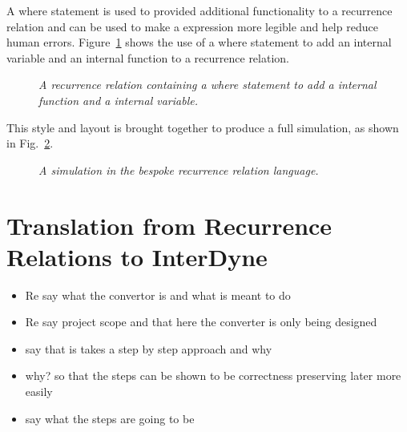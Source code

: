 \documentclass{article}
\begin{document}
A where statement is used to provided additional functionality to a recurrence relation and can be used to make a expression more legible and help reduce human errors. Figure~\ref{fig:7exofla} shows the use of a where statement to add an internal variable and an internal function to a recurrence relation. 
\begin{figure}[H]
	\centering
	
	\caption{\it A recurrence relation containing a where statement to add a internal function and a internal variable.}
	\label{fig:7exofla}
\end{figure} 

This style and layout is brought together to produce a full simulation, as shown in Fig.~\ref{fig:8exofla}.
\begin{figure}[H]
	\centering
	
	\caption{\it A simulation in the bespoke recurrence relation language.}
	\label{fig:8exofla}
\end{figure} 







\section{Translation from Recurrence Relations to InterDyne} 


\begin{itemize}
  \item Re say what the convertor is and what is meant to do
  \item Re say project scope and that here the converter is only being designed 
  \item say that is takes a step by step approach and why 
  \item why? so that the steps can be shown to be correctness preserving later more easily 
  \item say what the steps are going to be 
\end{itemize}


\end{document}
